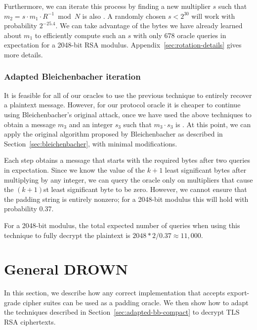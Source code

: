 Furthermore, we can iterate this process by finding a new multiplier $s$ such that $m_2 = s \cdot m_1 \cdot R^{-1} \bmod N$ is also \sslconform.  A randomly chosen $s < 2^{30}$ will work with probability $2^{-25.4}$.  We can take advantage of the bytes we have already learned about $m_1$ to efficiently compute such an $s$ with only 678 oracle queries in expectation for a 2048-bit RSA modulus.   Appendix~\ref{sec:rotation-details} gives more details.

\subsubsection{Adapted Bleichenbacher iteration}
\label{sec:bb-iteration}
It is feasible for all of our oracles to use the previous technique to entirely recover a plaintext message.  However, for our \ssltwo protocol oracle it is cheaper to continue using Bleichenbacher's original attack, once we have used the above techniques to obtain a \sslconform message $m_3$ and an integer $s_3$ such that $m_3 \cdot s_3$ is \sslconform.  At this point, we can apply the original algorithm proposed by Bleichenbacher as described in Section~\ref{sec:bleichenbacher}, with minimal modifications.

Each step obtains a message that starts with the required  bytes after two queries in expectation.
Since we know the value of the $k+1$ least significant bytes after multiplying by any integer, we can query the oracle only on multipliers that cause the $(k+1)$st least significant byte to be zero.  However, we cannot ensure that the padding string is entirely nonzero; for a 2048-bit modulus this will hold with probability 0.37.

For a 2048-bit modulus, the total expected number of queries when using this technique to fully decrypt the plaintext is $2048 * 2 / 0.37 \approx 11,000$.


\section{General DROWN} 
\label{vulnerability}

In this section, we describe how any correct \ssltwo implementation that accepts export-grade cipher suites can be used as a padding oracle.  We then show how to adapt the techniques described in Section~\ref{sec:adapted-bb-compact} to decrypt TLS RSA ciphertexts.

